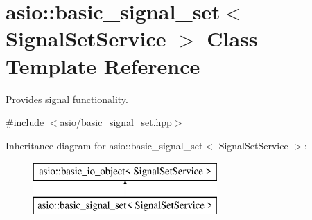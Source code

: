 \hypertarget{classasio_1_1basic__signal__set}{}\section{asio\+:\+:basic\+\_\+signal\+\_\+set$<$ Signal\+Set\+Service $>$ Class Template Reference}
\label{classasio_1_1basic__signal__set}


Provides signal functionality.  




{\ttfamily \#include $<$asio/basic\+\_\+signal\+\_\+set.\+hpp$>$}

Inheritance diagram for asio\+:\+:basic\+\_\+signal\+\_\+set$<$ Signal\+Set\+Service $>$\+:\begin{figure}[H]
\begin{center}
\leavevmode
\includegraphics[height=2.000000cm]{classasio_1_1basic__signal__set}
\end{center}
\end{figure}
